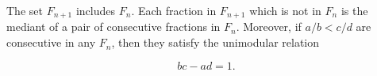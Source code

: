 The set $F_{n+1}$ includes $F_n$. Each fraction in $F_{n+1}$ which is not in $F_n$ is the mediant of a pair of consecutive fractions in $F_n$. Moreover, if $a/b < c/d$ are consecutive in any $F_n$, then they satisfy the unimodular relation

$$bc - ad = 1.$$
